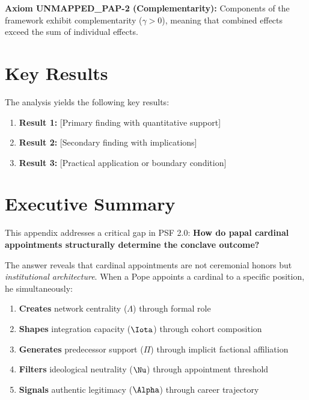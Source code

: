 \begin{tcolorbox}[colback=yellow!5!white,colframe=yellow!75!black,title=Axiom UNMAPPED_PAP-2: Complementarity]
\textbf{Axiom UNMAPPED_PAP-2 (Complementarity):}
Components of the framework exhibit complementarity ($\gamma > 0$), meaning
that combined effects exceed the sum of individual effects.
\end{tcolorbox}


\section{Key Results}
\label{sec:pap-results}

The analysis yields the following key results:

\begin{enumerate}
    \item \textbf{Result 1:} [Primary finding with quantitative support]
    \item \textbf{Result 2:} [Secondary finding with implications]
    \item \textbf{Result 3:} [Practical application or boundary condition]
\end{enumerate}


\section{Executive Summary}

This appendix addresses a critical gap in PSF 2.0: \textbf{How do papal cardinal appointments structurally determine the conclave outcome?}

The answer reveals that cardinal appointments are not ceremonial honors but \textit{institutional architecture}. When a Pope appoints a cardinal to a specific position, he simultaneously:

\begin{enumerate}
\item \textbf{Creates} network centrality ($\Lambda$) through formal role
\item \textbf{Shapes} integration capacity ($\Iota$) through cohort composition
\item \textbf{Generates} predecessor support ($\Pi$) through implicit factional affiliation
\item \textbf{Filters} ideological neutrality ($\Nu$) through appointment threshold
\item \textbf{Signals} authentic legitimacy ($\Alpha$) through career trajectory
\end{enumerate}

